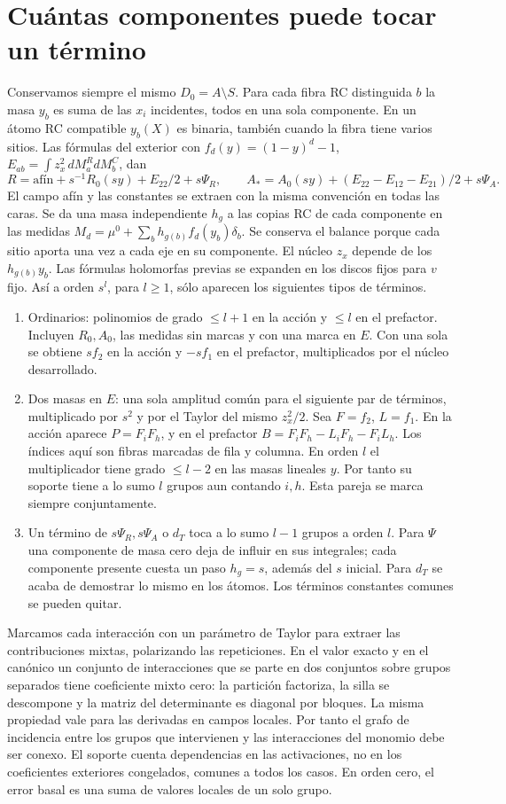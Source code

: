 \section{Cuántas componentes puede tocar un término}
Conservamos siempre el mismo $D_0=A\setminus S$. Para cada fibra RC distinguida $b$
la masa $y_b$ es suma de las $x_i$ incidentes, todos en una sola componente.
En un átomo RC compatible $y_b(X)$ es binaria, también cuando la fibra tiene varios sitios.
Las fórmulas del exterior con $f_d(y)=(1-y)^d-1$, $E_{ab}=\int z_x^2\,dM_a^R dM_b^C$, dan
\[
 R=\text{afín}+s^{-1}R_0(sy)+E_{22}/2+s\Psi_R,\qquad
 A_*=A_0(sy)+(E_{22}-E_{12}-E_{21})/2+s\Psi_A .
\]
El campo afín y las constantes se extraen con la misma convención en todas las caras.
Se da una masa independiente $h_g$ a las copias RC de cada componente en las medidas
$M_d=\mu^0+\sum_b h_{g(b)}f_d(y_b)\delta_b$. Se conserva el balance porque cada sitio
aporta una vez a cada eje en su componente. El núcleo $z_x$ depende de los $h_{g(b)}y_b$.
Las fórmulas holomorfas previas se expanden en los discos fijos para $v$ fijo.
Así a orden $s^l$, para $l\ge1$, sólo aparecen los siguientes tipos de términos.
\begin{enumerate}
\item Ordinarios: polinomios de grado $\le l+1$ en la acción y $\le l$ en el prefactor.
Incluyen $R_0,A_0$, las medidas sin marcas y con una marca en $E$. Con una sola se obtiene
$s f_2$ en la acción y $-s f_1$ en el prefactor, multiplicados por el núcleo desarrollado.
\item Dos masas en $E$: una sola amplitud común para el siguiente par de términos,
multiplicado por $s^2$ y por el Taylor del mismo $z_x^2/2$. Sea $F=f_2$, $L=f_1$.
En la acción aparece $P=F_iF_h$, y en el prefactor $B=F_iF_h-L_iF_h-F_iL_h$.
Los índices aquí son fibras marcadas de fila y columna. En orden $l$ el multiplicador
tiene grado $\le l-2$ en las masas lineales $y$. Por tanto su soporte tiene a lo sumo
$l$ grupos aun contando $i,h$. Esta pareja se marca siempre conjuntamente.
\item Un término de $s\Psi_R,s\Psi_A$ o $d_T$ toca a lo sumo $l-1$ grupos a orden $l$.
Para $\Psi$ una componente de masa cero deja de influir en sus integrales; cada componente
presente cuesta un paso $h_g=s$, además del $s$ inicial. Para $d_T$ se acaba de demostrar
lo mismo en los átomos. Los términos constantes comunes se pueden quitar.
\end{enumerate}

Marcamos cada interacción con un parámetro de Taylor para extraer las contribuciones
mixtas, polarizando las repeticiones. En el valor exacto y en el canónico un conjunto
de interacciones que se parte en dos conjuntos sobre grupos separados tiene coeficiente
mixto cero: la partición factoriza, la silla se descompone y la matriz del determinante
es diagonal por bloques. La misma propiedad vale para las derivadas en campos locales.
Por tanto el grafo de incidencia entre los grupos que intervienen y las interacciones
del monomio debe ser conexo. El soporte cuenta dependencias en las activaciones, no en los
coeficientes exteriores congelados, comunes a todos los casos. En orden cero, el error
basal es una suma de valores locales de un solo grupo.

